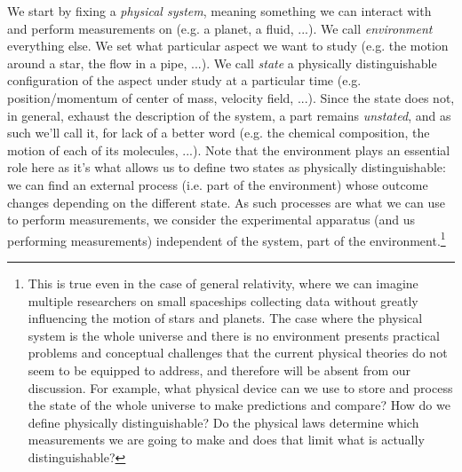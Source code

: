 \documentclass[smallextended]{svjour3}
\numberwithin{equation}{section}
\theoremstyle{definition}
\begin{document}
We start by fixing a \emph{physical system}, meaning something we can interact with and perform measurements on (e.g. a planet, a fluid, ...). We call \emph{environment} everything else. We set what particular aspect we want to study (e.g. the motion around a star, the flow in a pipe, ...). We call \emph{state} a physically distinguishable configuration of the aspect under study at a particular time (e.g. position/momentum of center of mass, velocity field, ...). Since the state does not, in general, exhaust the description of the system, a part remains \emph{unstated}, and as such we'll call it, for lack of a better word (e.g. the chemical composition, the motion of each of its molecules, ...). Note that the environment plays an essential role here as it's what allows us to define two states as physically distinguishable: we can find an external process (i.e. part of the environment) whose outcome changes depending on the different state. As such processes are what we can use to perform measurements, we consider the experimental apparatus (and us performing measurements) independent of the system, part of the environment.\footnote{This is true even in the case of general relativity, where we can imagine multiple researchers on small spaceships collecting data without greatly influencing the motion of stars and planets. The case where the physical system is the whole universe and there is no environment presents practical problems  and conceptual challenges that the current physical theories do not seem to be equipped to address, and therefore will be absent from our discussion. For example, what physical device can we use to store and process the state of the whole universe to make predictions and compare? How do we define physically distinguishable? Do the physical laws determine which measurements we are going to make and does that limit what is actually distinguishable?}
 
\end{document}
